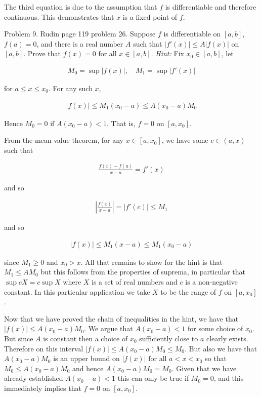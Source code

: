 \documentclass{article}
\begin{document}
  The third equation is due to the assumption that $f$ is differentiable and therefore continuous.  This demonstrates that $x$ is a fixed point of $f$.

  \pagebreak

  {\Large \color{Sepia} Problem 9. Rudin page 119 problem 26. Suppose $f$ is differentiable on $[a,b]$, $f(a)=0$, and there is a real number $A$ such that $|f'(x)|\leq A|f(x)|$ on $[a,b]$.  Prove that $f(x)=0$ for all $x\in[a,b]$.  {\it Hint:} Fix $x_0\in[a,b]$, let

  \begin{align*}
    M_0 = \sup|f(x)|, \quad M_1 = \sup |f'(x)|
  \end{align*}

  for $a\leq x\leq x_0$.  For any such $x$,

  \begin{align*}
    |f(x)|\leq M_1(x_0-a)\leq A(x_0-a)M_0
  \end{align*}

  Hence $M_0=0$ if $A(x_0-a)<1$.  That is, $f=0$ on $[a,x_0]$.

  }

  \vspace{1cm}

  From the mean value theorem, for any $x\in [a,x_0]$, we have some $c\in (a,x)$ such that

  \begin{align*}
    \frac{f(x)-f(a)}{x-a} = f'(x)
  \end{align*}

  and so

  \begin{align*}
    \left|\frac{f(x)}{x-a}\right| = |f'(c)| \leq M_1
  \end{align*}

  and so

  \begin{align*}
    |f(x)|\leq M_1(x-a)\leq M_1(x_0-a)
  \end{align*}

  since $M_1\geq 0$ and $x_0>x$.  All that remains to show for the hint is that $M_1\leq AM_0$ but this follows from the properties of suprema, in particular that $\sup{cX}=c\sup X$ where $X$ is a set of real numbers and $c$ is a non-negative constant.  In this particular application we take $X$ to be the range of $f$ on $[a,x_0]$.

  Now that we have proved the chain of inequalities in the hint, we have that $|f(x)|\leq A(x_0-a)M_0$.  We argue that $A(x_0-a)<1$ for some choice of $x_0$.  But since $A$ is constant then a choice of $x_0$ sufficiently close to $a$ clearly exists.  Therefore on this interval $|f(x)|\leq A(x_0-a)M_0\leq M_0$.  But also we have that $A(x_0-a)M_0$ is an upper bound on $|f(x)|$ for all $a < x < x_0$ so that $M_0\leq A(x_0-a)M_0$ and hence $A(x_0-a)M_0=M_0$.  Given that we have already established $A(x_0-a)<1$ this can only be true if $M_0=0$, and this immediately implies that $f=0$ on $[a,x_0]$.
\end{document}
